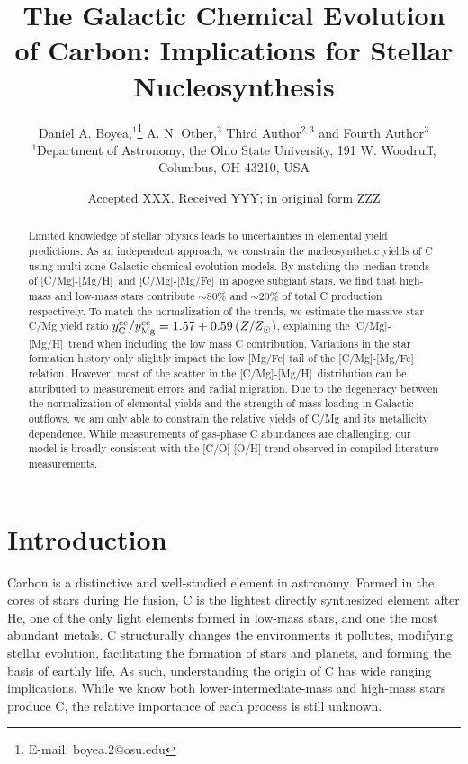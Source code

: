 \documentclass[fleqn,usenatbib]{mnras}
\title[Origin and Galactic Evolution of C]{The Galactic Chemical Evolution of Carbon: Implications for Stellar Nucleosynthesis }
\author[D. A. Boyea et. al.]{
Daniel A. Boyea,$^{1}$\thanks{E-mail: boyea.2@osu.edu}
A. N. Other,$^{2}$
Third Author$^{2,3}$
and Fourth Author$^{3}$
\\
$^{1}$Department of Astronomy, the Ohio State University, 191 W. Woodruff, Columbus, OH 43210, USA
}
\date{Accepted XXX. Received YYY; in original form ZZZ}
\newcommand{\caah}{[C/Mg]-[Mg/H]}
\newcommand{\caafe}{[C/Mg]-[Mg/Fe]}
\newcommand{\Ycc}{\ensuremath{y_{\rm C}^{\rm cc}}}
\newcommand{\Yoc}{\ensuremath{y_{\rm Mg}^{\rm cc}}}
\newcommand{\about}[1]{${\sim} #1$}
\begin{document}
\label{firstpage}
\pagerange{\pageref{firstpage}--\pageref{lastpage}}
\maketitle



\begin{abstract}
Limited knowledge of stellar physics leads to uncertainties in elemental yield predictions.
As an independent approach, we constrain the nucleosynthetic yields of C using multi-zone Galactic chemical evolution models.
By matching the median trends of \caah\ and \caafe\ in  {\sc apogee} subgiant stars, we find that high-mass and low-mass stars contribute \about{80\%} and \about{20\%} of total C production respectively.
% 
To match the normalization of the trends, we estimate the massive star C/Mg yield ratio $\Ycc/\Yoc = 1.57 + 0.59 \left(Z/Z_\odot\right)$,  explaining the \caah\ trend when including the low mass C contribution.
%
Variations in the star formation history only slightly impact the low [Mg/Fe] tail of the [C/Mg]-[Mg/Fe] relation. However, most of the scatter in the \caah\ distribution can be attributed to measurement errors and radial migration. 
% 
Due to the degeneracy between the normalization of elemental yields and the strength of mass-loading in Galactic outflows, we am only able to constrain the relative yields of C/Mg and its metallicity dependence. While measurements of gas-phase C abundances are challenging, our model is broadly consistent with the [C/O]-[O/H] trend observed in compiled literature measurements.


\end{abstract}







\section{Introduction}

Carbon is a distinctive and well-studied element in astronomy. 
Formed in the cores of stars during He fusion, C is the lightest directly synthesized element after He, one of the only light elements formed in low-mass stars, and one the most abundant metals\footnotemark{}. %
C structurally changes the environments it pollutes, modifying stellar evolution, facilitating the formation of stars and planets, and forming the basis of earthly life.
As such, understanding the origin of C has wide ranging implications. 
While we know both lower-intermediate-mass and high-mass stars produce C, the relative importance of each process is still unknown.
\end{document}

